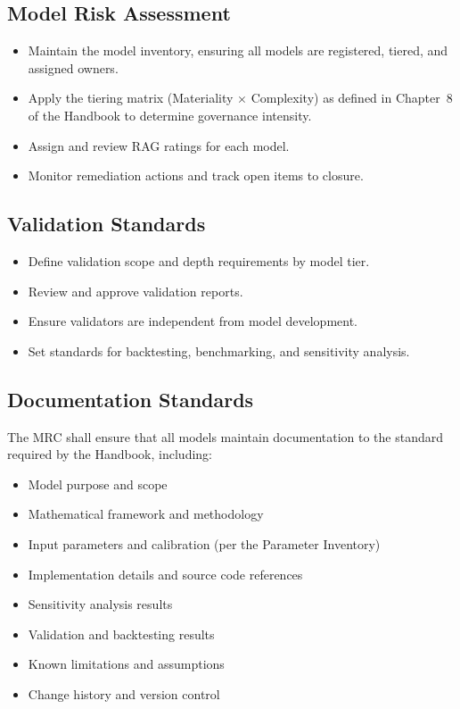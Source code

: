 \documentclass[11pt]{article}
\begin{document}
\subsection{Model Risk Assessment}

\begin{itemize}
    \item Maintain the model inventory, ensuring all models are registered,
          tiered, and assigned owners.
    \item Apply the tiering matrix (Materiality $\times$ Complexity) as defined
          in Chapter~8 of the Handbook to determine governance intensity.
    \item Assign and review RAG ratings for each model.
    \item Monitor remediation actions and track open items to closure.
\end{itemize}

\subsection{Validation Standards}

\begin{itemize}
    \item Define validation scope and depth requirements by model tier.
    \item Review and approve validation reports.
    \item Ensure validators are independent from model development.
    \item Set standards for backtesting, benchmarking, and sensitivity analysis.
\end{itemize}

\subsection{Documentation Standards}

The MRC shall ensure that all models maintain documentation to the standard
required by the Handbook, including:

\begin{itemize}
    \item Model purpose and scope
    \item Mathematical framework and methodology
    \item Input parameters and calibration (per the Parameter Inventory)
    \item Implementation details and source code references
    \item Sensitivity analysis results
    \item Validation and backtesting results
    \item Known limitations and assumptions
    \item Change history and version control
\end{itemize}
\end{document}
